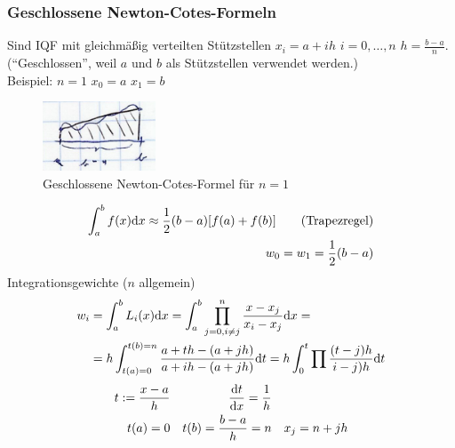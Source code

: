 \subsubsection{Geschlossene Newton-Cotes-Formeln}
Sind IQF mit gleichmäßig verteilten Stützstellen $x_i = a + ih$ $i=0,\ldots,n$ $h=\frac{b-a}{n}$.
(``Geschlossen'', weil $a$ und $b$ als Stützstellen verwendet werden.)\\
Beispiel: $n=1$ $x_0=a$ $x_1=b$
\begin{figure}[htbp]
  \centering
  \includegraphics[width=0.3\textwidth]{figures/bsp_g_ncf.png}
  \caption{Geschlossene Newton-Cotes-Formel für $n=1$}
\end{figure}
\begin{align*}
  \int_a^b f(x) \mathrm{d}x \approx \frac{1}{2} (b-a)[f(a)+f(b)] \tag{Trapezregel}\\
  w_0 = w_1 = \frac{1}{2} (b-a)
\end{align*}
Integrationsgewichte ($n$ allgemein)
\begin{align*}
  w_i &= \int_a^b L_i(x) \mathrm{d}x = \int_a^b \prod_{j=0,i\neq j}^n \frac{x-x_j}{x_i - x_j}\mathrm{d}x =\\
  &= h \int_{t(a) = 0}^{t(b) = n} \frac{a + th - (a+jh)}{a + ih - (a+jh)} \mathrm{d}t = h \int_0^t \prod \frac{(t-j)h}{i-j)h} \mathrm{d}t
\end{align*}
\begin{align*}
  t:= \frac{x-a}{h} && \frac{\mathrm{d}t}{\mathrm{d}x} = \frac{1}{h} \\
  t(a)=0 && t(b)=\frac{b-a}{h}=n && x_j = n + jh
\end{align*}

